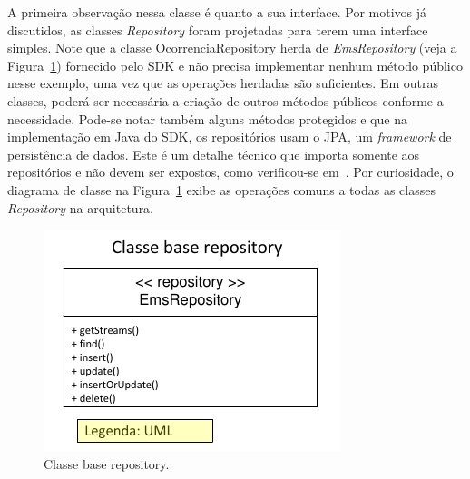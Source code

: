 \begin{itemize}
\begin{itemize}
			A primeira observação 
			nessa classe é quanto 
			a sua interface. 
			Por motivos já discutidos,
			as classes \textit{Repository}
			foram projetadas para
			terem uma interface simples. 
			Note que
			a classe OcorrenciaRepository 
			herda de 
			\textit{EmsRepository} (veja a Figura~\ref{fig:diagrama_classe_ems_repository})
			fornecido pelo \acrshort{SDK}
			e não precisa implementar nenhum 
			método público nesse exemplo, 
			uma vez que as operações 
			herdadas são suficientes. Em outras classes,
			poderá ser necessária a criação
			de outros métodos públicos conforme 
			a necessidade. Pode-se notar também
			alguns métodos protegidos
			e que na implementação em Java do \acrshort{SDK}, 
			os repositórios usam o \acrfull{JPA},
			um \textit{framework} de persistência de dados.
			Este é um detalhe técnico que importa
			somente aos repositórios e não devem 
			ser expostos, como 
			verificou-se em~\cite{evans2004domain, fowler2002patterns}.			
			Por curiosidade, o diagrama de classe 
			na Figura~\ref{fig:diagrama_classe_ems_repository}
			exibe as operações comuns a todas
			as classes \textit{Repository}
			na arquitetura.
		
		
\begin{figure}[htb]
\centering
\includegraphics[scale=1.5]{img/processo/exemplo_classe_repository.pdf}
\caption{Classe base repository.}
\label{fig:diagrama_classe_ems_repository}
\end{figure}
\FloatBarrier
	
	

	



\end{itemize}
\end{itemize}
